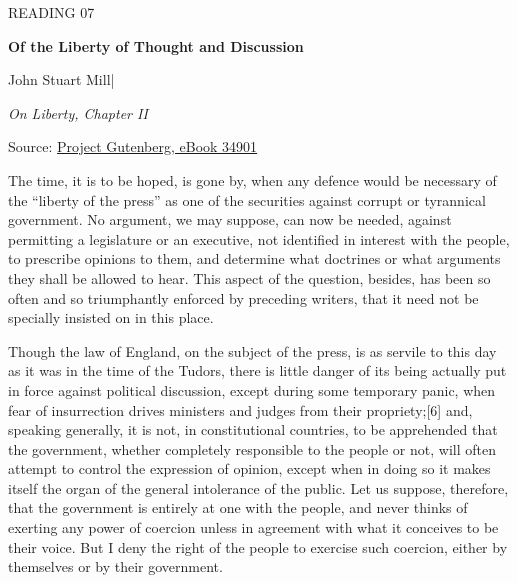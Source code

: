\begingroup

\thispagestyle{fancy}
\label{article-07}
\begingroup\raggedright
\setlength{\parindent}{0pt}
{\fontsize{9}{12}\selectfont\color{headgrey}READING 07\par}
\vspace{4pt}
{\fontsize{24}{30}\selectfont\bfseries Of the Liberty of Thought and Discussion\par}
\vspace{7pt}
{\fontsize{12}{18}\selectfont John Stuart Mill\quad|\par}
\vspace{4pt}
{\fontsize{11}{16}\selectfont\itshape On Liberty, Chapter II\par}
\vspace{4pt}
{\fontsize{9}{12.5}\selectfont\color{headgrey}Source: \href{https://www.gutenberg.org/ebooks/34901}{Project Gutenberg, eBook 34901}\par}
\endgroup
\vspace{6pt}

The time, it is to be hoped, is gone by, when any defence would be necessary of the “liberty of the press” as one of the securities against corrupt or tyrannical government. No argument, we may suppose, can now be needed, against permitting a legislature or an executive, not identified in interest with the people, to prescribe opinions to them, and determine what doctrines or what arguments they shall be allowed to hear. This aspect of the question, besides, has been so often and so triumphantly enforced by preceding writers, that it need not be specially insisted on in this place.\par

Though the law of England, on the subject of the press, is as servile to this day as it was in the time of the Tudors, there is little danger of its being actually put in force against political discussion, except during some temporary panic, when fear of insurrection drives ministers and judges from their propriety;[6] and, speaking generally, it is not, in constitutional countries, to be apprehended that the government, whether completely responsible to the people or not, will often attempt to control the expression of opinion, except when in doing so it makes itself the organ of the general intolerance of the public. Let us suppose, therefore, that the government is entirely at one with the people, and never thinks of exerting any power of coercion unless in agreement with what it conceives to be their voice. But I deny the right of the people to exercise such coercion, either by themselves or by their government.\par

